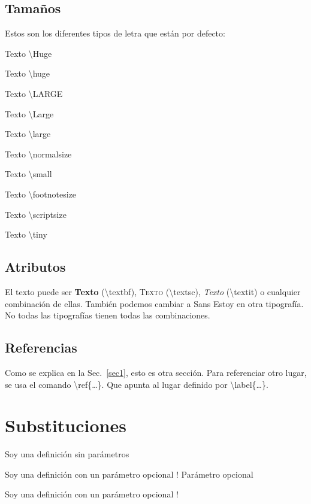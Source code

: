 \documentclass[11pt, a4paper]{article}
\begin{document}
\subsection{Tamaños}
Estos son los diferentes tipos de letra que están por defecto:
\begin{flushleft}
	\Huge{Texto \textbackslash Huge}

	\huge{Texto \textbackslash huge}

	\LARGE{Texto \textbackslash LARGE}

	\Large{Texto \textbackslash Large}

	\large{Texto \textbackslash large}

	\normalsize{Texto \textbackslash normalsize}

	\small{Texto \textbackslash small}

	\footnotesize{Texto \textbackslash footnotesize}

	\scriptsize{Texto \textbackslash scriptsize}

	\tiny{Texto \textbackslash tiny}
\end{flushleft}

\subsection{Atributos}
El texto puede ser \textbf{Texto} (\textbackslash textbf), \textsc{Texto} (\textbackslash textsc), \textit{Texto} (\textbackslash textit) o cualquier combinación de ellas. También podemos cambiar a Sans \textsf{Estoy en otra tipografía}. No todas las tipografías tienen todas las combinaciones.

\subsection{Referencias}
Como se explica en la Sec.~\ref{sec1}, esto es otra sección. Para referenciar otro lugar, se usa el comando \textbackslash ref\{\dots\}. Que apunta al lugar definido por \textbackslash label\{\dots\}.

\newcommand\helloA[1][]{Soy una definición sin parámetros}
\newcommand\helloB[1][]{Soy una definición con un parámetro opcional !\gdef\savearg{#1}}
\section{Substituciones}
\helloA

\helloB{ Parámetro opcional}

\helloB
\end{document}

